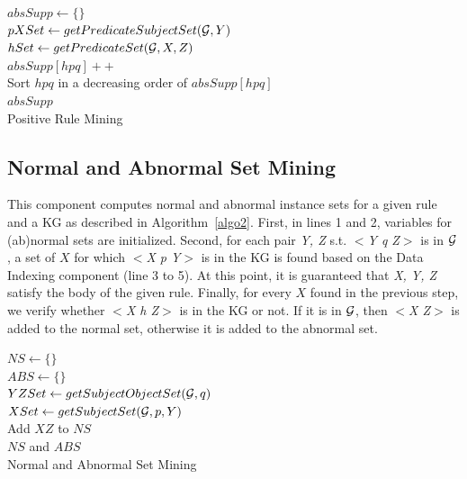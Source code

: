 \IncMargin{1.5em}
\begin{algorithm}[H]
\DontPrintSemicolon
\SetAlgoLined
{}
\BlankLine
$absSupp \leftarrow \{\}$\\
\BlankLine
{} {
    \BlankLine
	$pXSet \leftarrow getPredicateSubjectSet(\mathcal{G}, Y)$\\
	 {
		$hSet \leftarrow getPredicateSet(\mathcal{G}, X, Z)$\\
		 {
			$absSupp[hpq]++$\\
		}
	}
}
\BlankLine
Sort $hpq$ in a decreasing order of $absSupp[hpq]$\\
\Return $absSupp$\\
\caption{Positive Rule Mining}
\label{algo1}
\end{algorithm}
\DecMargin{1.5em}

\subsection{Normal and Abnormal Set Mining}

This component computes normal and abnormal instance sets for a given rule and a KG as described in Algorithm~\ref{algo2}. First, in lines 1 and 2, variables for (ab)normal sets are initialized. Second, for each pair \textit{Y, Z} s.t. \textit{$<$Y q Z$>$} is in $\mathcal{G}$, a set of $X$ for which \textit{$<$X p Y$>$} is in the KG is found based on the Data Indexing component (line 3 to 5). At this point, it is guaranteed that \textit{X, Y, Z} satisfy the body of the given rule. Finally, for every $X$ found in the previous step, we verify whether \textit{$<$X h Z$>$} is in the KG or not. If it is in $\mathcal{G}$, then \textit{$<$X Z$>$} is added to the normal set, otherwise it is added to the abnormal set.

\IncMargin{1.5em}
\begin{algorithm}[H]
\DontPrintSemicolon
\SetAlgoLined
{}
\BlankLine
$NS \leftarrow \{\}$\\
$ABS \leftarrow \{\}$\\
$YZSet \leftarrow getSubjectObjectSet(\mathcal{G}, q)$\\
\BlankLine
{} {
    \BlankLine
	$XSet \leftarrow getSubjectSet(\mathcal{G}, p, Y)$\\
	 {
	 {
		Add $XZ$ to $NS$\\
	}
	}
}
\BlankLine
\Return $NS$ and $ABS$\\
\caption{Normal and Abnormal Set Mining}
\label{algo2}
\end{algorithm}
\DecMargin{1.5em}

